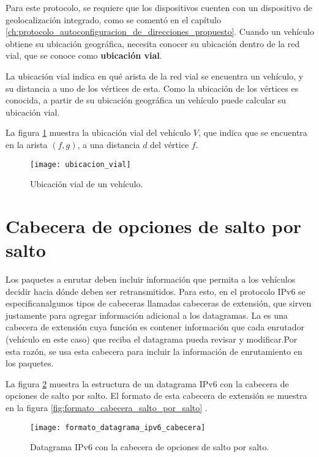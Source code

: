 Para este protocolo, se requiere que los dispositivos cuenten con un dispositivo
de geolocalización integrado, como se comentó en el capítulo
\ref{ch:protocolo_autoconfiguracion_de_direcciones_propuesto}. Cuando un
vehículo obtiene su ubicación geográfica, necesita conocer su ubicación dentro
de la red vial, que se conoce como \textbf{ubicación vial}.

La ubicación vial indica en qué arista de la red vial se encuentra un vehículo,
y su distancia a uno de los vértices de esta. Como la ubicación de los vértices
es conocida, a partir de su ubicación geográfica un vehículo puede calcular su
ubicación vial.

La figura \ref{fig:ubicacion_vial} muestra la ubicación vial del vehículo $V$,
que indica que se encuentra en la arista $(f,g)$, a una distancia $d$ del
vértice $f$.

\begin{figure}[th!]
\centering
\texttt{[image: ubicacion\_vial]} 
\decoRule
\caption[Ubicación vial de un vehículo]{Ubicación vial de un vehículo.}
\label{fig:ubicacion_vial}
\end{figure}

\section{Cabecera de opciones de salto por salto}
\label{sec:cabecera_opciones}

Los paquetes a enrutar deben incluir información que permita a los vehículos
decidir hacia dónde deben ser retransmitidos. Para esto, en el protocolo IPv6 se
especificanalgunos tipos de cabeceras llamadas cabeceras de extensión, que
sirven justamente para agregar información adicional a los datagramas. La
 es una cabecera de extensión
cuya función es contener información que cada enrutador (vehículo en este caso)
que reciba el datagrama pueda revisar y modificar.Por esta razón, se usa esta
cabecera para incluir la información de enrutamiento en los paquetes.

La figura \ref{fig:formato_datagrama_ipv6_cabecera} muestra la estructura de un
datagrama IPv6 con la cabecera de opciones de salto por salto. El formato de
esta cabecera de extensión se muestra en la figura
\ref{fig:formato_cabecera_salto_por_salto} \cite{RFC2460}.

\begin{figure}[th!]
\centering
\texttt{[image: formato\_datagrama\_ipv6\_cabecera]} 
\decoRule
\caption[Datagrama IPv6 con la cabecera de opciones de salto por
salto]{Datagrama IPv6 con la cabecera de opciones de salto por salto.}
\label{fig:formato_datagrama_ipv6_cabecera}
\end{figure}

